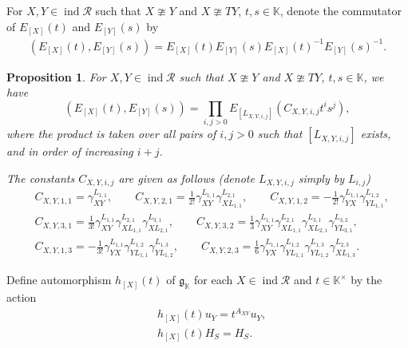 \documentclass[12pt]{amsart}
\newtheorem{proposition}[theorem]{Proposition}
\begin{document}
For $X,Y\in \operatorname{ind}\mathcal{R}$ such that $X\ncong Y$ and $X \ncong TY$, $ t,s\in \mathbb{K}$, denote the commutator of $E_{[X]}(t)$ and $E_{[Y]}(s)$ by
\begin{align*}
    (E_{[X]}(t),E_{[Y]}(s)) = E_{[X]}(t) E_{[Y]}(s) E_{[X]}(t)^{-1} E_{[Y]}(s)^{-1} .
\end{align*}


\begin{proposition}\cite[Proposition 4.2]{notes1}\label{commutator}
    For $X,Y\in \operatorname{ind}\mathcal{R}$ such that $X\ncong Y$ and $X \ncong TY$, $ t,s\in \mathbb{K}$, we have
    \begin{equation*}
        (E_{[X]}(t),E_{[Y]}(s))= \prod\limits_{i,j>0} E_{[L_{X,Y,i,j}]}(C_{X,Y,i,j}t^i s^j),
    \end{equation*}
where the product is taken over all pairs of $i,j>0$ such that $[L_{X,Y,i,j}]$ exists, and in order of increasing $i+j$. 


The constants $C_{X,Y,i,j}$ are given as follows (denote $L_{X,Y,i,j}$ simply by $L_{i,j}$)
\begin{align*}
    &C_{X,Y,1,1} = \gamma_{XY}^{L_{1,1}}, \qquad C_{X,Y,2,1} = \frac{1}{2!}\gamma_{XY}^{L_{1,1}}\gamma_{XL_{1,1}}^{L_{2,1}}, \qquad C_{X,Y,1,2} = -\frac{1}{2!}\gamma_{YX}^{L_{1,1}}\gamma_{YL_{1,1}}^{L_{1,2}}, \\
    &C_{X,Y,3,1} = \frac{1}{3!}\gamma_{XY}^{L_{1,1}}\gamma_{XL_{1,1}}^{L_{2,1}}\gamma_{XL_{2,1}}^{L_{3,1}},\qquad C_{X,Y,3,2} = \frac{1}{3} \gamma_{XY}^{L_{1,1}} \gamma_{XL_{1,1}}^{L_{2,1}} \gamma_{XL_{2,1}}^{L_{3,1}} \gamma_{YL_{3,1}}^{L_{3,2}},\\
    &C_{X,Y,1,3} = - \frac{1}{3!}\gamma_{YX}^{L_{1,1}}\gamma_{YL_{1,1}}^{L_{1,2}}\gamma_{YL_{1,2}}^{L_{1,3}} ,\qquad C_{X,Y,2,3} = \frac{1}{6} \gamma_{YX}^{L_{1,1}} \gamma_{YL_{1,1}}^{L_{1,2}} \gamma_{YL_{1,2}}^{L_{1,3}} \gamma_{XL_{1,3}}^{L_{2,3}}  . 
\end{align*}

\end{proposition}


Define automorphism $h_{[X]}(t)$ of $\mathfrak{g}_{\mathbb{K}}$ for each $X\in \operatorname{ind}\mathcal{R}$ and $t\in \mathbb{K}^{\times}$ by the action
\begin{align*}
    &h_{[X]}(t)u_{Y} = t^{A_{XY}} u_{Y}, \\
    &h_{[X]}(t)H_{S} = H_{S}.
\end{align*}
\end{document}
